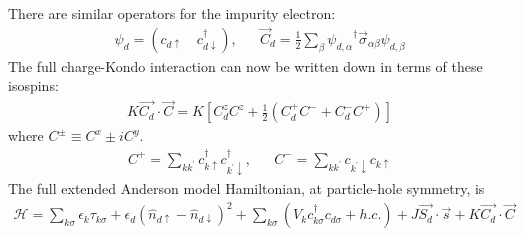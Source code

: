 There are similar operators for the impurity electron:
\begin{equation}\begin{aligned}
	\psi_d = \left( c_{d\uparrow} \quad c^\dagger_{d\downarrow}\right), &&\vec C_d = \frac{1}{2}\sum_{\beta} {\psi_{d,\alpha}}^\dagger \vec \sigma_{\alpha\beta} \psi_{d,\beta}
\end{aligned}\end{equation}
The full charge-Kondo interaction can now be written down in terms of these isospins:
\begin{equation}\begin{aligned}
	K \vec{C_d}\cdot\vec{C} = K \left[C_d^z C^z + \frac{1}{2}\left(C_d^+ C^-+ C_d^- C^+\right)\right]
\end{aligned}\end{equation}
where \(C^\pm \equiv C^x \pm iC^y\).
\begin{equation}\begin{aligned}
	C^+ = \sum_{kk^\prime} c^\dagger_{k\uparrow}c^\dagger_{k^\prime\downarrow}, && C^- = \sum_{kk^\prime}c_{k^\prime\downarrow}c_{k\uparrow}
\end{aligned}\end{equation}
The full extended Anderson model Hamiltonian, at particle-hole symmetry, is
\begin{equation}\begin{aligned}
	\mathcal{H} = \sum_{k\sigma}\epsilon_k \tau_{k\sigma} + \epsilon_d \left( \hat n_{d \uparrow} - \hat n_{d \downarrow} \right) ^2 + \sum_{k\sigma} \left(V_{k} c^\dagger_{k\sigma} c_{d\sigma} + h.c.\right) +J \vec{S_d}\cdot\vec{s} + K \vec{C_d}\cdot\vec{C}
\end{aligned}\end{equation}

